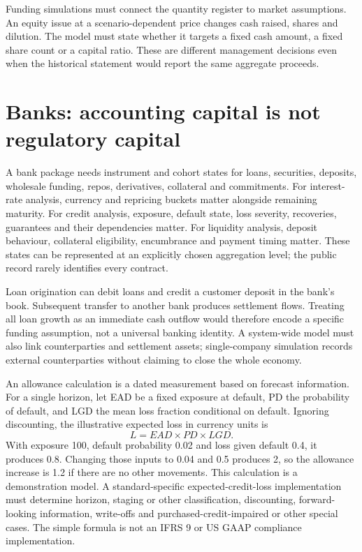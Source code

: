 Funding simulations must connect the quantity register to market assumptions.
An equity issue at a scenario-dependent price changes cash raised, shares and
dilution. The model must state whether it targets a fixed cash amount, a fixed
share count or a capital ratio. These are different management decisions even
when the historical statement would report the same aggregate proceeds.

\section{Banks: accounting capital is not regulatory capital}

A bank package needs instrument and cohort states for loans, securities,
deposits, wholesale funding, repos, derivatives, collateral and commitments.
For interest-rate analysis, currency and repricing buckets matter alongside
remaining maturity. For credit analysis, exposure, default state, loss severity,
recoveries, guarantees and their dependencies matter. For liquidity analysis,
deposit behaviour, collateral eligibility, encumbrance and payment timing matter.
These states can be represented at an explicitly chosen aggregation level;
the public record rarely identifies every contract.

Loan origination can debit loans and credit a customer deposit in the bank's
book. Subsequent transfer to another bank produces settlement flows. Treating
all loan growth as an immediate cash outflow would therefore encode a specific
funding assumption, not a universal banking identity. A system-wide model must
also link counterparties and settlement assets; single-company simulation
records external counterparties without claiming to close the whole economy.

An allowance calculation is a dated measurement based on forecast information.
For a single horizon, let EAD be a fixed exposure at default, PD the probability
of default, and LGD the mean loss fraction conditional on default. Ignoring
discounting, the illustrative expected loss in currency units is
\[
 L=EAD\times PD\times LGD.
\]
With exposure 100, default probability 0.02 and loss given default 0.4, it
produces 0.8. Changing those inputs to 0.04 and 0.5 produces 2, so the allowance
increase is 1.2 if there are no other movements. This calculation is a
demonstration model. A standard-specific expected-credit-loss implementation
must determine horizon, staging or other classification, discounting,
forward-looking information, write-offs and purchased-credit-impaired or
other special cases. The simple formula is not an IFRS 9 or US GAAP compliance
implementation.


